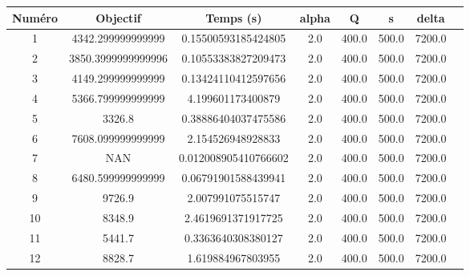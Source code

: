 \begin{tabular}{|c|c|c|c|c|c|c|c|}
\hline
 Numéro & Objectif & Temps (s) & alpha & Q & s & delta \\
\hline
1 & 4342.299999999999 & 0.15500593185424805 & 2.0 & 400.0 & 500.0 & 7200.0 \\ 
 \hline
2 & 3850.3999999999996 & 0.10553383827209473 & 2.0 & 400.0 & 500.0 & 7200.0 \\ 
 \hline
3 & 4149.299999999999 & 0.13424110412597656 & 2.0 & 400.0 & 500.0 & 7200.0 \\ 
 \hline
4 & 5366.799999999999 & 4.199601173400879 & 2.0 & 400.0 & 500.0 & 7200.0 \\ 
 \hline
5 & 3326.8 & 0.38886404037475586 & 2.0 & 400.0 & 500.0 & 7200.0 \\ 
 \hline
6 & 7608.099999999999 & 2.154526948928833 & 2.0 & 400.0 & 500.0 & 7200.0 \\ 
 \hline
7 & NAN & 0.012008905410766602 & 2.0 & 400.0 & 500.0 & 7200.0 \\ 
 \hline
8 & 6480.599999999999 & 0.06791901588439941 & 2.0 & 400.0 & 500.0 & 7200.0 \\ 
 \hline
9 & 9726.9 & 2.007991075515747 & 2.0 & 400.0 & 500.0 & 7200.0 \\ 
 \hline
10 & 8348.9 & 2.4619691371917725 & 2.0 & 400.0 & 500.0 & 7200.0 \\ 
 \hline
11 & 5441.7 & 0.3363640308380127 & 2.0 & 400.0 & 500.0 & 7200.0 \\ 
 \hline
12 & 8828.7 & 1.619884967803955 & 2.0 & 400.0 & 500.0 & 7200.0 \\ 
 \hline
\end{tabular}
